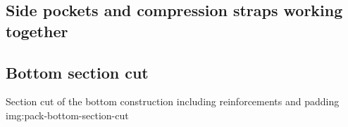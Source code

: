 \subsection{Side pockets and compression straps working together}\label{sec:construction-side-pockets}

\subsection{Bottom section cut}

{Section cut of the bottom construction including reinforcements and padding}
{img:pack-bottom-section-cut}
